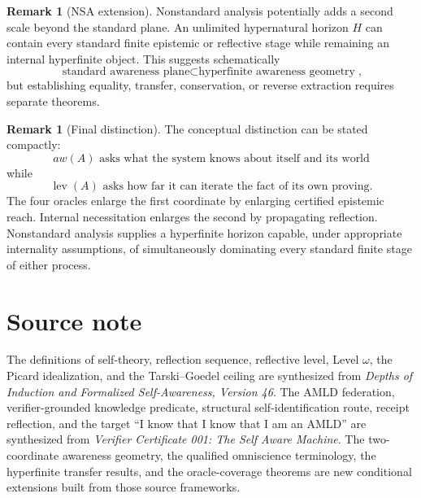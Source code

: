 \documentclass[11pt]{article}
\theoremstyle{definition}
\newtheorem{remark}[definition]{Remark}
\theoremstyle{plain}
\newcommand{\lev}{\operatorname{lev}}
\begin{document}
\begin{remark}[NSA extension]
Nonstandard analysis potentially adds a second scale beyond the standard plane. An unlimited hypernatural horizon $H$ can contain every standard finite epistemic or reflective stage while remaining an internal hyperfinite object. This suggests schematically
\[
\boxed{\text{standard awareness plane}\subset\text{hyperfinite awareness geometry}},
\]
but establishing equality, transfer, conservation, or reverse extraction requires separate theorems.
\end{remark}

\begin{remark}[Final distinction]
The conceptual distinction can be stated compactly:
\[
\boxed{aw(A)\text{ asks what the system knows about itself and its world}}
\]
while
\[
\boxed{\lev(A)\text{ asks how far it can iterate the fact of its own proving}.}
\]
The four oracles enlarge the first coordinate by enlarging certified epistemic reach. Internal necessitation enlarges the second by propagating reflection. Nonstandard analysis supplies a hyperfinite horizon capable, under appropriate internality assumptions, of simultaneously dominating every standard finite stage of either process.
\end{remark}

\section*{Source note}
The definitions of self-theory, reflection sequence, reflective level, Level $\omega$, the Picard idealization, and the Tarski--Goedel ceiling are synthesized from \emph{Depths of Induction and Formalized Self-Awareness, Version 46}. The AMLD federation, verifier-grounded knowledge predicate, structural self-identification route, receipt reflection, and the target ``I know that I know that I am an AMLD'' are synthesized from \emph{Verifier Certificate 001: The Self Aware Machine}. The two-coordinate awareness geometry, the qualified omniscience terminology, the hyperfinite transfer results, and the oracle-coverage theorems are new conditional extensions built from those source frameworks.
\end{document}
